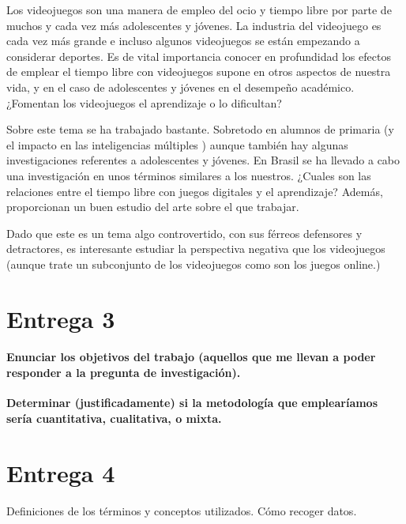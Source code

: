 \documentclass[palatino,nochap]{apuntesURJC}
\begin{document}
Los videojuegos son una manera de empleo del ocio y tiempo libre por parte de muchos y cada vez más adolescentes y jóvenes. 
%
La industria del videojuego es cada vez más grande e incluso algunos videojuegos se están empezando a considerar deportes.
%
Es de vital importancia conocer en profundidad los efectos de emplear el tiempo libre con videojuegos supone en otros aspectos de nuestra vida, y en el caso de adolescentes y jóvenes en el desempeño académico. 
%
¿Fomentan los videojuegos el aprendizaje o lo dificultan?


Sobre este tema se ha trabajado bastante. 
%
Sobretodo en alumnos de primaria (y el impacto en las inteligencias múltiples \cite{del2015videogames} ) aunque también hay algunas investigaciones referentes a adolescentes y jóvenes.
%
En Brasil se ha llevado a cabo una investigación \cite{PimenPimen2014xw} en unos términos similares a los nuestros. 
%
¿Cuales son las relaciones entre el tiempo libre con juegos digitales y el aprendizaje? 
%
Además, proporcionan un buen estudio del arte sobre el que trabajar.

Dado que este es un tema algo controvertido, con sus férreos defensores y detractores, es interesante estudiar la perspectiva negativa que los videojuegos \cite{OnlineGamesYoung} (aunque trate un subconjunto de los videojuegos como son los juegos online.)





\section{Entrega 3}

\paragraph{Enunciar los objetivos del trabajo (aquellos que me llevan a poder responder a la pregunta de investigación).\\}
\textbf{ Determinar (justificadamente) si la metodología que emplearíamos sería cuantitativa, cualitativa, o mixta.}


\section{Entrega 4}

Definiciones de los términos y conceptos utilizados.
%
Cómo recoger datos.





\printindex
\end{document}

